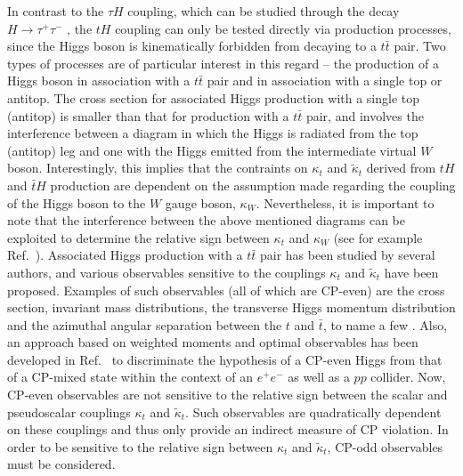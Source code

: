 \documentclass[aps,preprint,tightenlines,floatfix,superscriptaddress,nofootinbib,showpacs]{revtex4-1}
\def\tbar{\bar{t}}
\def\kp{\kappa_t}
\def\kpt{\tilde{\kappa}_t}
\begin{document}
In contrast to the $\tau H$ coupling, which can be studied through the
decay $H\rightarrow \tau^+\tau^-$ \cite{tau},
the $tH$ coupling can only be tested directly via production processes, since the
Higgs boson is kinematically forbidden from decaying to a $t\tbar$ pair.
Two types of processes are of particular interest in this regard -- the
production of a Higgs boson in association with a $t\tbar$ pair
and in association with a single top or antitop. The cross section
for associated Higgs production with a single top (antitop)
is smaller than that for production with a $t\tbar$ pair, and involves
the interference between a diagram in which the Higgs is radiated from
the top (antitop) leg and one with the Higgs emitted from the
intermediate virtual $W$ boson. Interestingly, this implies that the contraints
on $\kp$ and $\kpt$ derived from $tH$ and $\tbar H$ production are
dependent on the assumption made regarding the coupling of the Higgs boson to the
$W$ gauge boson, $\kappa_W$. Nevertheless, it is important to note that the
interference between the above mentioned diagrams
can be exploited to determine the
relative sign between $\kp$ and $\kappa_W$ (see for example
Ref.~\cite{tHmaltoni}).  Associated Higgs production with a
$t\tbar$ pair has been studied by several authors, and
various observables sensitive to the couplings $\kp$ and $\kpt$ have
been proposed. Examples of such observables (all of which are
$\mathrm{CP}$-even) are the cross section, 
invariant mass distributions, the transverse Higgs momentum
distribution and the azimuthal angular separation between the $t$ and $\tbar$,
to name a few \cite{Guadagnoli,*Boosted,*Li,*Golden,*Khatibi}. Also, an approach based on weighted
moments and optimal observables has been developed in Ref.~\cite
{Gunion1,*Gunion2,*Gunion3,*Gunion} to discriminate the hypothesis of
a $\mathrm{CP}$-even Higgs from that of a $\mathrm{CP}$-mixed state
within the context of an $e^+ e^-$ as well as a $pp$ collider.
 Now, $\mathrm{CP}$-even observables are not
sensitive to the relative sign between the scalar and pseudoscalar
couplings $\kp$ and $\kpt$. Such observables are quadratically
dependent on these couplings and thus only provide an indirect measure
of $\mathrm{CP}$ violation. In order to be sensitive to the relative
sign between $\kp$ and $\kpt$, $\mathrm{CP}$-odd observables must be
considered. \par
\end{document}
